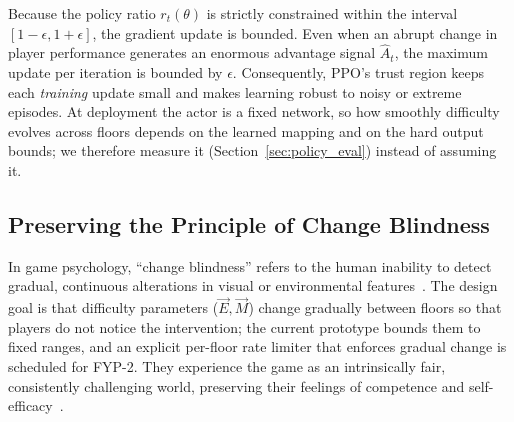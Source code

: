 Because the policy ratio $r_t(\theta)$ is strictly constrained within the interval $[1-\epsilon, 1+\epsilon]$, the gradient update is bounded. Even when an abrupt change in player performance generates an enormous advantage signal $\hat{A}_t$, the maximum update per iteration is bounded by $\epsilon$. Consequently, PPO's trust region keeps each \emph{training} update small and makes learning robust to noisy or extreme episodes. At deployment the actor is a fixed network, so how smoothly difficulty evolves across floors depends on the learned mapping and on the hard output bounds; we therefore measure it (Section~\ref{sec:policy_eval}) instead of assuming it.

\subsection{Preserving the Principle of Change Blindness}
In game psychology, ``change blindness'' refers to the human inability to detect gradual, continuous alterations in visual or environmental features~\cite{simons2005change}. The design goal is that difficulty parameters ($\vec{E}, \vec{M}$) change gradually between floors so that players do not notice the intervention; the current prototype bounds them to fixed ranges, and an explicit per-floor rate limiter that enforces gradual change is scheduled for FYP-2. They experience the game as an intrinsically fair, consistently challenging world, preserving their feelings of competence and self-efficacy~\cite{tyack2020sdt}.
